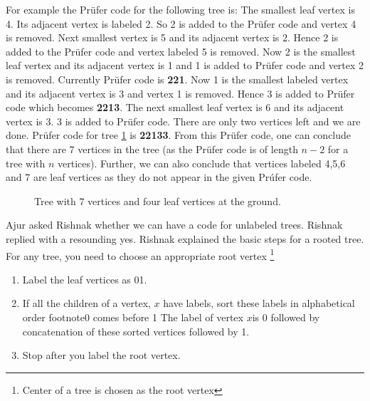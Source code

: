 For example the Pr{\"u}fer code for the following tree is: The smallest leaf vertex is 4. Its adjacent vertex is labeled 2. So 2 is added to the Pr{\"u}fer code and vertex 4 is removed. Next smallest vertex is 5 and its adjacent vertex is 2. Hence 2 is added to the Pr{\"u}fer code and vertex labeled 5 is removed. Now 2 is the smallest leaf vertex and its adjacent vertex is 1 and  1 is added to Pr{\"u}fer code and vertex 2 is removed. Currently Pr{\"u}fer code is \textbf{221}. Now 1 is the smallest labeled vertex and its adjacent vertex is 3 and vertex 1 is removed. Hence 3 is added to Pr{\"u}fer code which becomes \textbf{2213}. The next smallest leaf vertex is 6 and its adjacent vertex is 3. 3 is added to Pr{\"u}fer code. There are only two vertices left and we are done. Pr{\"u}fer code for tree \ref{8g5} is \textbf{22133}. From this Pr{\"u}fer code, one can conclude that there are 7 vertices in the tree (as the Pr{\"u}fer code is of length $n-2$ for a tree with $n$ vertices). Further, we can also conclude that vertices labeled 4,5,6 and 7 are leaf vertices as they do not appear in the given Pr{\'u}fer code. 
\begin{figure}
\begin{center}


\caption{Tree with 7 vertices and four leaf vertices at the ground. }\label{8g5}
\end{center}
\end{figure}

Ajur asked Rishnak whether we can have a code for unlabeled trees. Rishnak replied with a resounding yes. Rishnak explained the basic steps for a rooted tree. For any tree, you need to choose an appropriate root vertex \footnote{Center of a tree is chosen as the root vertex} 
\begin{enumerate}
    \item  Label the leaf vertices as 01.
    \item If all the children of a vertex, $x$ have labels, sort these labels in alphabetical order footnote{0 comes before 1} The label of vertex $x$is 0 followed by concatenation of these sorted vertices followed by 1.
    \item Stop after you label the root vertex.
\end{enumerate}

